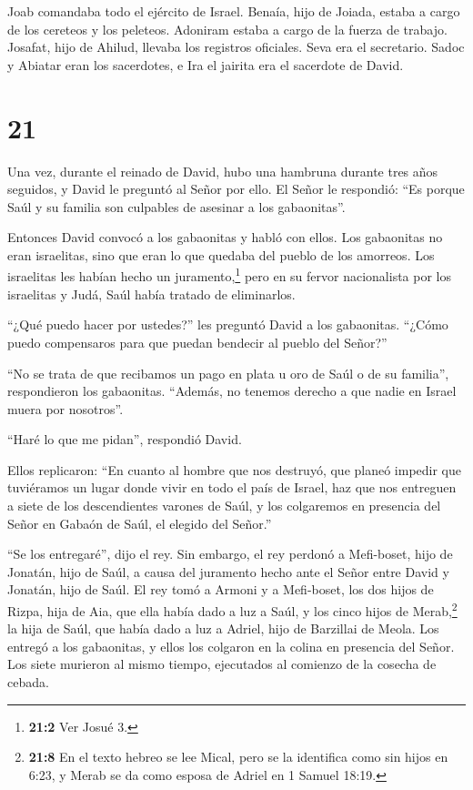  Joab comandaba todo el ejército de Israel. Benaía, hijo de
Joiada, estaba a cargo de los cereteos y los peleteos. 
Adoniram estaba a cargo de la fuerza de trabajo. Josafat, hijo de
Ahilud, llevaba los registros oficiales.  Seva era el
secretario. Sadoc y Abiatar eran los sacerdotes,  e Ira el
jairita era el sacerdote de David.

\hypertarget{section-20}{%
\section{21}\label{section-20}}

 Una vez, durante el reinado de David, hubo una hambruna
durante tres años seguidos, y David le preguntó al Señor por ello. El
Señor le respondió: ``Es porque Saúl y su familia son culpables de
asesinar a los gabaonitas''.

 Entonces David convocó a los gabaonitas y habló con ellos.
Los gabaonitas no eran israelitas, sino que eran lo que quedaba del
pueblo de los amorreos. Los israelitas les habían hecho un
juramento,\footnote{\textbf{21:2} Ver Josué 3.} pero en su fervor
nacionalista por los israelitas y Judá, Saúl había tratado de
eliminarlos.

 ``¿Qué puedo hacer por ustedes?'' les preguntó David a los
gabaonitas. ``¿Cómo puedo compensaros para que puedan bendecir al pueblo
del Señor?''

 ``No se trata de que recibamos un pago en plata u oro de
Saúl o de su familia'', respondieron los gabaonitas. ``Además, no
tenemos derecho a que nadie en Israel muera por nosotros''.

``Haré lo que me pidan'', respondió David.

 Ellos replicaron: ``En cuanto al hombre que nos destruyó,
que planeó impedir que tuviéramos un lugar donde vivir en todo el país
de Israel,  haz que nos entreguen a siete de los
descendientes varones de Saúl, y los colgaremos en presencia del Señor
en Gabaón de Saúl, el elegido del Señor.''

``Se los entregaré'', dijo el rey.  Sin embargo, el rey
perdonó a Mefi-boset, hijo de Jonatán, hijo de Saúl, a causa del
juramento hecho ante el Señor entre David y Jonatán, hijo de Saúl.
 El rey tomó a Armoni y a Mefi-boset, los dos hijos de
Rizpa, hija de Aia, que ella había dado a luz a Saúl, y los cinco hijos
de Merab,\footnote{\textbf{21:8} En el texto hebreo se lee Mical, pero
  se la identifica como sin hijos en 6:23, y Merab se da como esposa de
  Adriel en 1 Samuel 18:19.} la hija de Saúl, que había dado a luz a
Adriel, hijo de Barzillai de Meola.  Los entregó a los
gabaonitas, y ellos los colgaron en la colina en presencia del Señor.
Los siete murieron al mismo tiempo, ejecutados al comienzo de la cosecha
de cebada.

